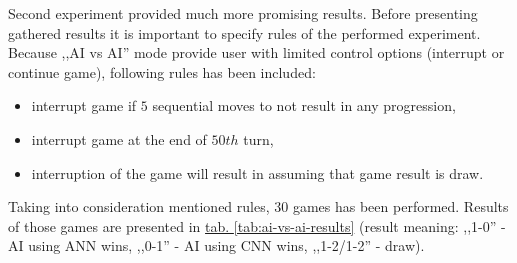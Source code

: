 Second experiment provided much more promising results. Before presenting gathered results it is important to specify rules of the performed experiment. Because ,,AI vs AI'' mode provide user with limited control options (interrupt or continue game), following rules has been included:
\begin{itemize}
    \item interrupt game if $5$ sequential moves to not result in any progression,
    \item interrupt game at the end of $50th$ turn,
    \item interruption of the game will result in assuming that game result is draw.
\end{itemize}
Taking into consideration mentioned rules, $30$ games has been performed. Results of those games are presented in \hyperref[tab:ai-vs-ai-results]{tab. \ref*{tab:ai-vs-ai-results}} (result meaning: ,,1-0'' - AI using ANN wins, ,,0-1'' - AI using CNN wins, ,,1-2/1-2'' - draw).
